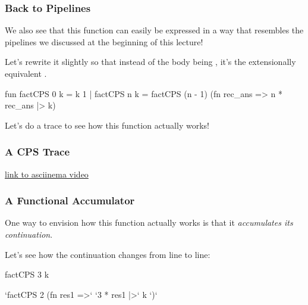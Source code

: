 \documentclass[aspectratio=169, handout]{beamer}
\begin{document}
\begin{frame}[fragile]
  \frametitle{Back to Pipelines}

  We also see that this function can easily be expressed in a way that
  resembles the pipelines we discussed at the beginning of this lecture!

  \pause
  \vspace{\fill}

  Let's rewrite it slightly so that instead of the body being ,
  it's the extensionally equivalent .

  \pause
  \begin{codeblock}
    fun factCPS 0 k = k 1
      | factCPS n k =
          factCPS (n - 1)    (fn rec_ans =>
          n * rec_ans     |> k)
  \end{codeblock}

  \pause
  \vspace{\fill}

  Let's do a trace to see how this function actually works!
\end{frame}

\begin{frame}[fragile]
  \frametitle{A CPS Trace}

  \begin{center}
    \huge \color{blue} \href{https://asciinema.org/a/WxUSfzU1xOdbJkikgyy6wFJ0l}{link to asciinema video}
\end{center}
\end{frame}

\begin{frame}[fragile]
  \frametitle{A Functional Accumulator}

  One way to envision how this function actually works is that it \textit{accumulates
  its continuation}.

  \pause
  \vspace{\fill}

  Let's see how the continuation changes from line to line:

  \begin{codeblock}
    factCPS 3 k
  \end{codeblock}

  \pause
  \vspace{\fill}

  \begin{codeblock}
    `factCPS 2    (fn res1 =>`
    `3 * res1  |>` k `)`
  \end{codeblock}
\end{frame}
\end{document}
